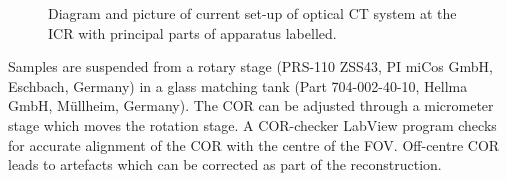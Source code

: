 	\begin{figure}[H]
		\centering
		\caption{Diagram and picture  of current set-up of optical CT system at the ICR with principal parts of apparatus labelled.}
		\label{fig:setup_pic}
	\end{figure}

Samples are suspended from a rotary stage (PRS-110 ZSS43, PI miCos GmbH, Eschbach, Germany) in a glass matching tank (Part 704-002-40-10, Hellma GmbH, M\"{u}llheim, Germany). The COR can be adjusted through a micrometer stage which moves the rotation stage. A COR-checker LabView program checks for accurate alignment of the COR with the centre of the FOV. Off-centre COR leads to artefacts which can be corrected as part of the reconstruction.

